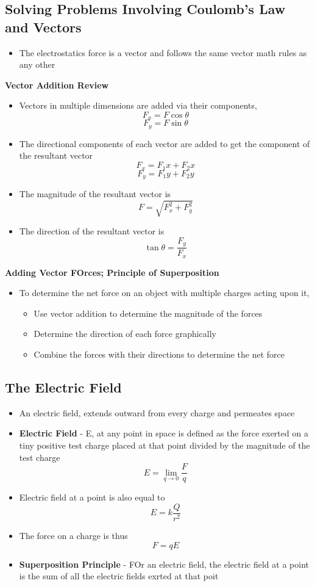 \subsection{Solving Problems Involving Coulomb's Law and Vectors}
\begin{itemize}
    \item The electrostatics force is a vector and follows the same vector math rules as any other
\end{itemize}

\textbf{Vector Addition Review} 
\begin{itemize}
    \item Vectors in multiple dimensions are added via their components, \[F_x=F\cos\theta\] \[F_y=F\sin\theta\]
    \item The directional components of each vector are added to get the component of the resultant vector \[F_x=F_1x+F_2x\] \[F_y=F_1y+F_2y\]
    \item The magnitude of the resultant vector is \[F=\sqrt{F_x^2+F_y^2}\]
    \item The direction of the resultant vector is \[\tan\theta=\frac{F_y}{F_x}\]
\end{itemize}

\textbf{Adding Vector FOrces; Principle of Superposition}
\begin{itemize}
    \item To determine the net force on an object with multiple charges acting upon it, 
    \begin{itemize}
        \item Use vector addition to determine the magnitude of the forces
        \item Determine the direction of each force graphically
        \item Combine the forces with their directions to determine the net force
    \end{itemize}
\end{itemize}

\subsection{The Electric Field}
\begin{itemize}
    \item An electric field, extends outward from every charge and permeates space
    \item \textbf{Electric Field} - E, at any point in space is defined as the force exerted on a tiny positive test charge placed at that point divided by the magnitude of the test charge \[E=\lim_{q\to0}\frac{F}{q}\]
    \item Electric field at a point is also equal to \[E=k\frac{Q}{r^2}\]
    \item The force on a charge is thus \[F=qE\]
    \item \textbf{Superposition Principle} - FOr an electric field, the electric field at a point is the sum of all the electric fields exrted at that poit
\end{itemize}

